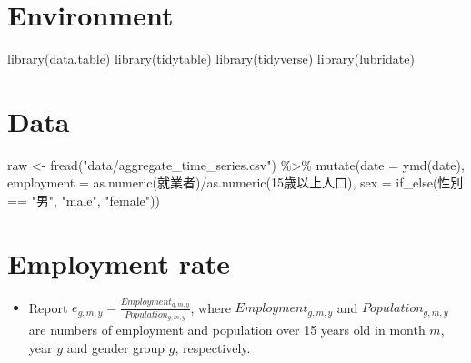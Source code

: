 \documentclass[
]{book}
\newenvironment{Shaded}{\begin{snugshade}}{\end{snugshade}}
\newcommand{\AttributeTok}[1]{\textcolor[rgb]{0.77,0.63,0.00}{#1}}
\newcommand{\FunctionTok}[1]{\textcolor[rgb]{0.00,0.00,0.00}{#1}}
\newcommand{\NormalTok}[1]{#1}
\newcommand{\OtherTok}[1]{\textcolor[rgb]{0.56,0.35,0.01}{#1}}
\newcommand{\SpecialCharTok}[1]{\textcolor[rgb]{0.00,0.00,0.00}{#1}}
\newcommand{\StringTok}[1]{\textcolor[rgb]{0.31,0.60,0.02}{#1}}
\providecommand{\tightlist}{%
  \setlength{\itemsep}{0pt}\setlength{\parskip}{0pt}}
\begin{document}
\hypertarget{environment-1}{%
\section{Environment}\label{environment-1}}

\begin{Shaded}
\begin{Highlighting}[]
\FunctionTok{library}\NormalTok{(data.table)}
\FunctionTok{library}\NormalTok{(tidytable)}
\FunctionTok{library}\NormalTok{(tidyverse)}
\FunctionTok{library}\NormalTok{(lubridate)}
\end{Highlighting}
\end{Shaded}

\hypertarget{data-1}{%
\section{Data}\label{data-1}}

\begin{Shaded}
\begin{Highlighting}[]
\NormalTok{raw }\OtherTok{\textless{}{-}} 
  \FunctionTok{fread}\NormalTok{(}\StringTok{"data/aggregate\_time\_series.csv"}\NormalTok{) }\SpecialCharTok{\%\textgreater{}\%}
  \FunctionTok{mutate}\NormalTok{(}\AttributeTok{date =} \FunctionTok{ymd}\NormalTok{(date),}
         \AttributeTok{employment =} \FunctionTok{as.numeric}\NormalTok{(就業者)}\SpecialCharTok{/}\FunctionTok{as.numeric}\NormalTok{(}\StringTok{\textasciigrave{}}\AttributeTok{15歳以上人口}\StringTok{\textasciigrave{}}\NormalTok{),}
         \AttributeTok{sex =} \FunctionTok{if\_else}\NormalTok{(性別 }\SpecialCharTok{==} \StringTok{"男"}\NormalTok{, }\StringTok{"male"}\NormalTok{, }\StringTok{"female"}\NormalTok{))}
\end{Highlighting}
\end{Shaded}

\hypertarget{employment-rate-1}{%
\section{Employment rate}\label{employment-rate-1}}

\begin{itemize}
\tightlist
\item
  Report \(e_{g,m,y} = \frac{Employment_{g,m,y}}{Population_{g,m,y}}\), where \(Employment_{g,m,y}\) and \(Population_{g,m,y}\) are numbers of employment and population over 15 years old in month \(m\), year \(y\) and gender group \(g\), respectively.
\end{itemize}
\end{document}
